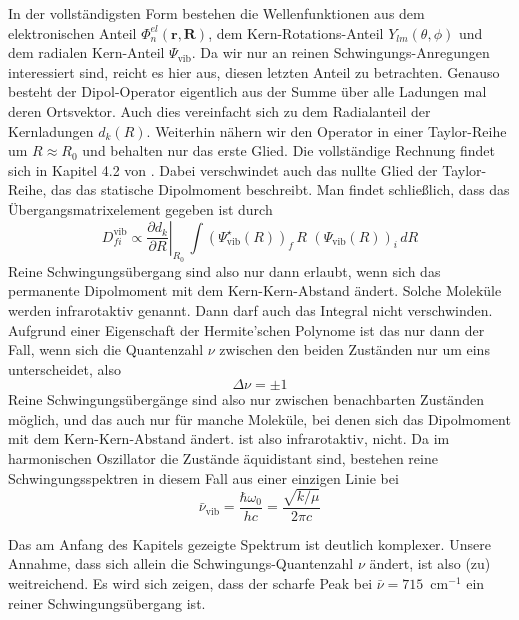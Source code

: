 In der vollständigsten Form bestehen die Wellenfunktionen aus dem elektronischen Anteil $ \Phi_n^{el}  (\mathbf{r}, \mathbf{R})  $, dem Kern-Rotations-Anteil $ Y_{l m} (\theta, \phi)$ und dem radialen Kern-Anteil  $\Psi_\text{vib}$. Da wir nur an reinen Schwingungs-Anregungen interessiert sind, reicht es hier aus, diesen letzten Anteil zu betrachten. Genauso besteht der Dipol-Operator eigentlich aus der Summe über alle Ladungen mal deren Ortsvektor. Auch dies vereinfacht sich zu dem Radialanteil der Kernladungen $d_k(R)$. Weiterhin nähern wir den Operator in einer Taylor-Reihe um $R \approx R_0$ und behalten nur das erste Glied. Die vollständige Rechnung findet sich in Kapitel 4.2 von \cite{Demtröder_molekuelphysik}. Dabei verschwindet auch das nullte Glied der Taylor-Reihe, das das statische Dipolmoment beschreibt. Man findet schließlich, dass das Übergangsmatrixelement gegeben ist durch
\begin{equation}
D_{fi}^\text{vib} \propto  \left. \frac{\partial d_k}{\partial R} \right|_{R_0} \,  \int (\Psi_\text{vib}^\star (R) )_f \, R  \, \, (\Psi_\text{vib} (R) )_i \, dR
\end{equation}
Reine Schwingungsübergang sind also nur dann erlaubt, wenn sich das permanente Dipolmoment mit dem Kern-Kern-Abstand ändert. Solche Moleküle werden infrarotaktiv genannt. Dann  darf auch das Integral nicht verschwinden. Aufgrund einer Eigenschaft der Hermite'schen Polynome ist das nur dann der Fall, wenn sich die Quantenzahl $\nu$ zwischen den beiden Zuständen nur um eins unterscheidet, also 
\begin{equation}
 \Delta \nu = \pm 1
\end{equation}
Reine Schwingungsübergänge sind also nur zwischen benachbarten Zuständen möglich, und das auch nur für manche Moleküle, bei denen sich das Dipolmoment mit dem Kern-Kern-Abstand ändert.  ist also infrarotaktiv,  nicht. Da im harmonischen Oszillator die Zustände äquidistant sind, bestehen reine Schwingungsspektren in diesem Fall aus einer einzigen Linie bei 
\begin{equation}
 \bar{\nu}_\text{vib} = \frac{\hbar \omega_0}{h c} = \frac{\sqrt{k / \mu} }{2 \pi  c}
\end{equation}

Das am Anfang des Kapitels gezeigte Spektrum ist deutlich komplexer. Unsere Annahme, dass sich allein die Schwingungs-Quantenzahl $\nu$ ändert, ist also (zu) weitreichend. Es wird sich zeigen, dass der scharfe Peak bei $\bar{\nu} = 715$~cm$^{-1}$ ein reiner Schwingungsübergang ist.

